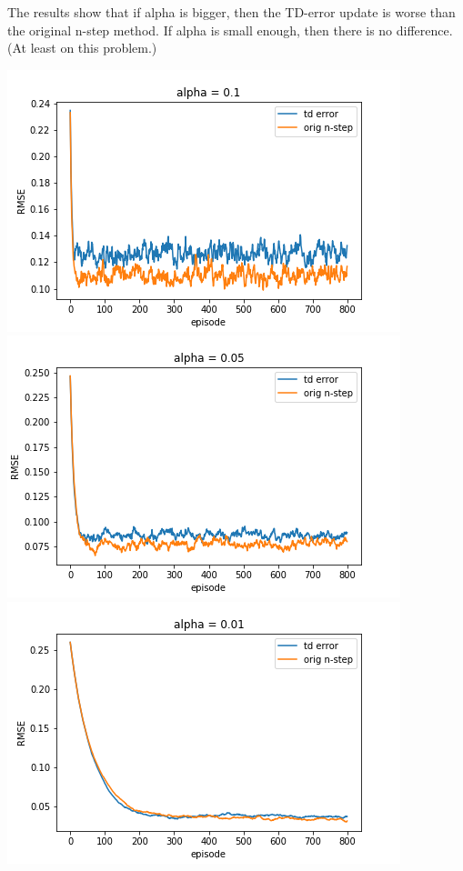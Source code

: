 \documentclass[12pt,a4paper]{article}
\begin{document}
\begin{enumerate}
    The results show that if alpha is bigger, then the TD-error update is worse than the original n-step method. If alpha is small enough, then there is no
    difference. (At least on this problem.)
    \begin{center}
    \includegraphics[scale=0.45]{0.1}
    \includegraphics[scale=0.45]{0.05}
    \\
    \includegraphics[scale=0.45]{0.01}

\end{center}
\end{enumerate}
\end{document}
